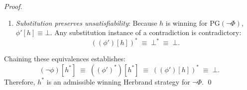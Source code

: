 \documentclass[runningheads]{llncs}
\newcommand{\PG}{\mathrm{PG}}
\begin{document}
\begin{proof}
\begin{enumerate}
              \begin{equation*}
                  ((\phi')^*)[h^*] \;\equiv\; ((\phi')[h])^* .
              \end{equation*}
        \item \emph{Substitution preserves unsatisfiability}:
              Because $h$ is winning for $\PG(\neg\Phi)$, $\phi'[h] \equiv \bot$.
              Any substitution instance of a contradiction is contradictory:
              \begin{equation*}
                  ((\phi')[h])^* \;\equiv\; \bot^* \;\equiv\; \bot .
              \end{equation*}
    \end{enumerate}
    Chaining these equivalences establishes:
    \begin{equation*}
        (\neg\phi)[h^*] \;\equiv\; ((\phi')^*)[h^*] \;\equiv\; ((\phi')[h])^* \;\equiv\; \bot .
    \end{equation*}
    Therefore, $h^*$ is an admissible winning Herbrand strategy for $\neg\Phi$.
    \qed
\end{proof}
\end{document}
